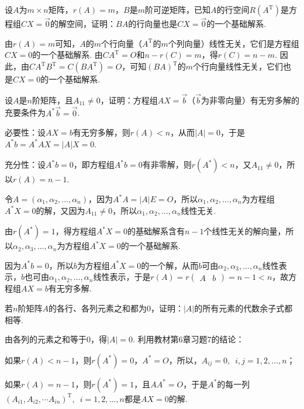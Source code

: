 \begin{exercise}
\begin{exgroup}
        \item 设$A$为$m \times n$矩阵，$r(A)=m$，$B$是$m$阶可逆矩阵，已知$A$的行空间$R(A^\mathrm{T})$是方程组$CX=\vec{0}$的解空间，证明：$BA$的行向量也是$CX=\vec{0}$的一个基础解系.
        \begin{answer}
            由$r(A)=m$可知，$A$的$m$个行向量（$A^\mathrm{T}$的$m$个列向量）线性无关，它们是方程组$CX=0$的一个基础解系. 由$CA^\mathrm{T}=O$和$n-r(C)=m$，得$r(C)=n-m$. 因此，由$CA^\mathrm{T}B^\mathrm{T}=C(BA^\mathrm{T})=O$，可知$(BA)^\mathrm{T}$的$m$个行向量线性无关，它们也是$CX=0$的一个基础解系.
        \end{answer}

        \item 设$A$是$n$阶矩阵，且$A_{11}\neq 0$，证明：方程组$AX=\vec{b}$（$\vec{b}$为非零向量）有无穷多解的充要条件为$A^*\vec{b}=\vec{0}$.
        \begin{answer}
            必要性：设$AX=b$有无穷多解，则$r(A)<n$，从而$|A|=0$，于是$A^*b=A^*AX=|A|X=0$.

          充分性：设$A^*b=0$，即方程组$A^*b=0$有非零解，则$r(A^*)<n$，又$A_{11}\neq 0$，所以$r(A)=n-1$.

          令$A=(\alpha_1,\alpha_2,\ldots,\alpha_n)$，因为$A^*A=|A|E=O$，所以$\alpha_1,\alpha_2,\ldots,\alpha_n$为方程组$A^*X=0$的解，又因为$A_{11}\neq 0$，所以$\alpha_1,\alpha_2,\ldots,\alpha_n$线性无关.

          由$r(A^*)=1$，得方程组$A^*X=0$的基础解系含有$n-1$个线性无关的解向量，所以$\alpha_2,\alpha_3,\ldots,\alpha_n$为方程组$A^*X=0$的一个基础解系.

          因为$A^*b=0$，所以$b$为方程组$A^*X=0$的一个解，从而$b$可由$\alpha_2,\alpha_3,\ldots,\alpha_n$线性表示，$b$也可由$\alpha_1,\alpha_2,\ldots,\alpha_n$线性表示，于是$r(A) = r\begin{pmatrix}A & b\end{pmatrix}=n-1<n$，故方程组$AX=b$有无穷多解.
        \end{answer}

        \item 若$n$阶矩阵$A$的各行、各列元素之和都为0，证明：$|A|$的所有元素的代数余子式都相等.
        \begin{answer}
            由各列的元素之和等于0，得$|A|=0$. 利用教材第6章习题7的结论：

          如果$r(A)<n-1$，则$r(A^*)=0$，$A^*=O$，所以，$A_{ij}=0,\enspace i,j=1,2,\ldots,n$；

          如果$r(A)=n-1$，则$r(A^*)=1$，且$AA^*=O$，于是$A^*$的每一列$(A_{i1},A_{i2},\cdots A_{in})^\mathrm{T},\enspace i=1,2,\ldots,n$都是$AX=0$的解.


\end{answer}
\end{exgroup}
\end{exercise}
